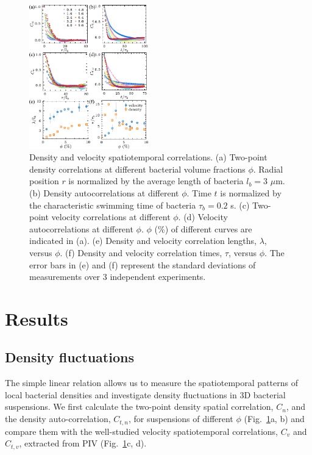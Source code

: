 \documentclass[twocolumn,aps,prx,amsmath,amssymb,longbibliography,superscriptaddress]{revtex4-2}
\begin{document}
\begin{figure}[t]
	\begin{center}
		\includegraphics[width=0.46\textwidth]{Figures/fig-2.pdf}
		\caption[spatiotemporal-correlations.]
		{
			Density and velocity spatiotemporal correlations. (a) Two-point density correlations at different bacterial volume fractions $\phi$. Radial position $r$ is normalized by the average length of bacteria $l_b = 3$ $\mu$m. (b) Density autocorrelations at different $\phi$. Time $t$ is normalized by the characteristic swimming time of bacteria $\tau_b = 0.2$ s. (c) Two-point velocity correlations at different $\phi$. (d) Velocity autocorrelations at different $\phi$. $\phi$ ($\%$) of different curves are indicated in (a). (e) Density and velocity correlation lengths, $\lambda$, versus $\phi$. (f) Density and velocity correlation times, $\tau$, versus $\phi$. The error bars in (e) and (f) represent the standard deviations of measurements over 3 independent experiments.
		}
		\label{fig:spatiotemporal-correlations}
	\end{center}
\end{figure}




\section{Results}

\subsection{Density fluctuations}

The simple linear relation allows us to measure the spatiotemporal patterns of local bacterial densities and investigate density fluctuations in 3D bacterial suspensions. We first calculate the two-point density spatial correlation, $C_n$, and the density auto-correlation, $C_{t,n}$, for suspensions of different $\phi$ (Fig.~\ref{fig:spatiotemporal-correlations}a, b) and compare them with the well-studied velocity spatiotemporal correlations, $C_{v}$ and $C_{t,v}$, extracted from PIV (Fig.~\ref{fig:spatiotemporal-correlations}c, d).
\end{document}
